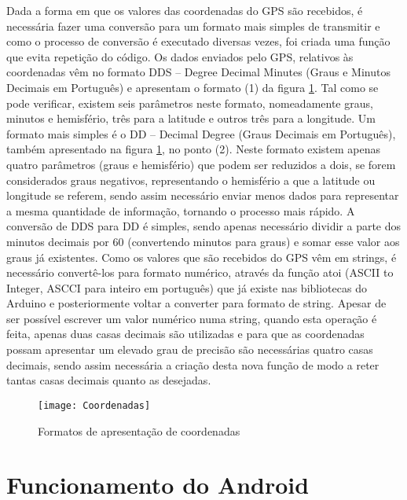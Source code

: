 Dada a forma em que os valores das coordenadas do GPS são recebidos, é necessária fazer uma conversão para um formato mais simples de transmitir e como o processo de conversão é executado diversas vezes, foi criada uma função que evita repetição do código.
Os dados enviados pelo GPS, relativos às coordenadas vêm no formato DDS – Degree Decimal Minutes (Graus e Minutos Decimais em Português) e apresentam o formato (1) da figura \ref{fig:formatos_de_apresentacao_de_coordenadas}.
Tal como se pode verificar, existem seis parâmetros neste formato, nomeadamente graus, minutos  e hemisfério, três para a latitude e outros três para a longitude. 
Um formato mais simples é o DD – Decimal Degree (Graus Decimais em Português), também apresentado na figura \ref{fig:formatos_de_apresentacao_de_coordenadas}, no ponto (2).
Neste formato existem apenas quatro parâmetros (graus e hemisfério) que podem ser reduzidos a dois, se forem considerados graus negativos, representando o hemisfério a que a latitude ou longitude se referem, sendo assim necessário enviar menos dados para representar a mesma quantidade de informação, tornando o processo mais rápido.
A conversão de DDS para DD é simples, sendo apenas necessário dividir a parte dos minutos decimais por 60 (convertendo minutos para graus) e somar esse valor aos graus já existentes.
Como os valores que são recebidos do GPS vêm em strings, é necessário convertê-los para formato numérico, através da função atoi (ASCII to Integer, ASCCI para inteiro em português) que já existe nas bibliotecas do Arduino e posteriormente voltar a converter para formato de string.
Apesar de ser possível escrever um valor numérico numa string, quando esta operação é feita, apenas duas casas decimais são utilizadas e para que as coordenadas possam apresentar um elevado grau de precisão são necessárias quatro casas decimais, sendo assim necessária a criação desta nova função de modo a reter tantas casas decimais quanto as desejadas.

\begin{figure}[!htbp]
	\centering
	\texttt{[image: Coordenadas]}
	\caption{Formatos de apresentação de coordenadas}
	\label{fig:formatos_de_apresentacao_de_coordenadas}
\end{figure}

\section{Funcionamento do Android}
\label{sec:funcionamento_do_android}

